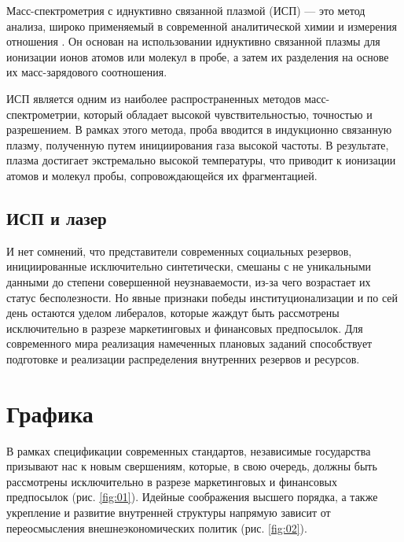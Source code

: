 \documentclass{esdiploma}
\begin{document}
Масс-спектрометрия с иднуктивно связанной плазмой (ИСП) --- это метод анализа, широко применяемый в современной аналитической химии и измерения отношения \upb. Он основан на использовании иднуктивно связанной плазмы для ионизации ионов атомов или молекул в пробе, а затем их разделения на основе их масс-зарядового соотношения.

ИСП является одним из наиболее распространенных методов масс-спектрометрии, который    обладает высокой чувствительностью, точностью и разрешением. В рамках этого метода, проба вводится в индукционно связанную плазму, полученную путем инициирования газа высокой частоты. В результате, плазма достигает экстремально высокой температуры, что приводит к ионизации атомов и молекул пробы, сопровождающейся их фрагментацией.

\section{ИСП и лазер}

И нет сомнений, что представители современных социальных резервов, инициированные исключительно синтетически, смешаны с не уникальными данными до степени совершенной неузнаваемости, из-за чего возрастает их статус бесполезности. Но явные признаки победы институционализации и по сей день остаются уделом либералов, которые жаждут быть рассмотрены исключительно в разрезе маркетинговых и финансовых предпосылок. Для современного мира реализация намеченных плановых заданий способствует подготовке и реализации распределения внутренних резервов и ресурсов.


\chapter{Графика}

 В рамках спецификации современных стандартов, независимые государства призывают нас к новым свершениям, которые, в свою очередь, должны быть рассмотрены исключительно в разрезе маркетинговых и финансовых предпосылок (рис. \ref{fig:01}). Идейные соображения высшего порядка, а также укрепление и развитие внутренней структуры напрямую зависит от переосмысления внешнеэкономических политик (рис. \ref{fig:02}).
\end{document}
